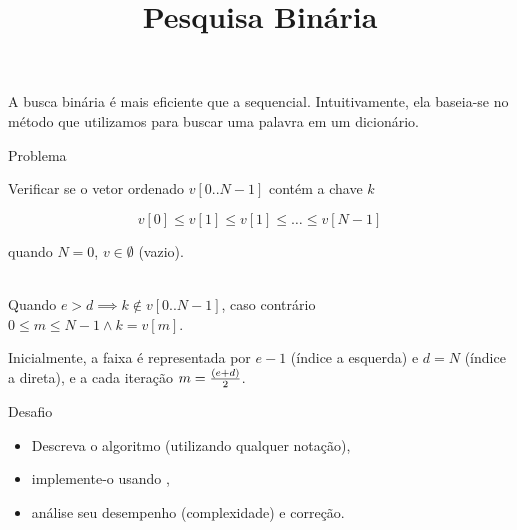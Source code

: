 \title{Pesquisa Binária}
\maketitle

\begin{frame}{\inserttitle}

  A busca binária é mais eficiente que a sequencial. Intuitivamente, ela
  baseia-se no método que utilizamos para buscar uma palavra em um
  dicionário.

  \smallskip
  \begin{block}{Problema}

    Verificar se o vetor ordenado $v[0..N-1]$ contém a chave $k$

    $$v[0]\leq v[1]\leq v[1] \leq \ldots\leq v[N-1]$$

    quando $N=0$, $v\in\emptyset$ (vazio).

    \begin{tabbing}
      \hspace{3.75cm}\ \=\\
      Quando $e>d \implies k\not\in v[0..N-1]$, caso contrário \\
      \> $0\leq m\leq N-1 \land k=v[m]$.
    \end{tabbing}

    Inicialmente, a faixa é representada por $e-1$ (índice a esquerda) e
    $d=N$ (índice a direta), e a cada iteração $m={(e+d)\over 2}$. 
  \end{block}

\end{frame}

\begin{frame}{Desafio}


  \begin{itemize}
  \item Descreva o algoritmo (utilizando qualquer notação), 
  \item implemente-o usando \CEE,
  \item análise seu desempenho (complexidade) e correção.
  \end{itemize}

\end{frame}



